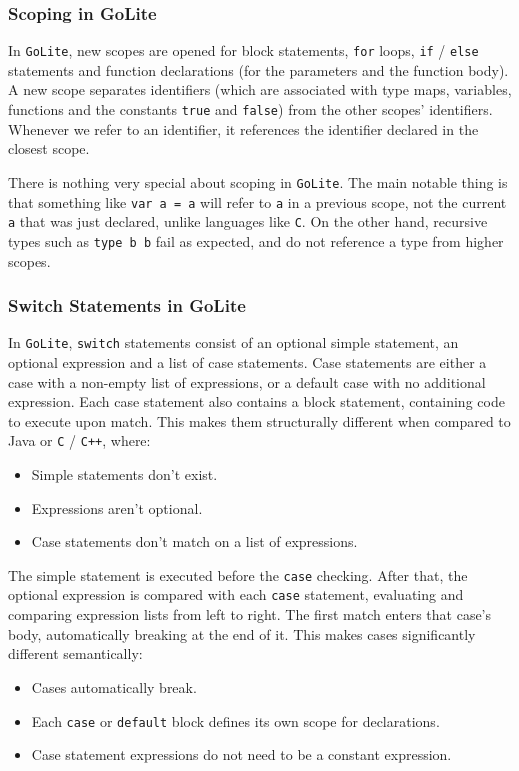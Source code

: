 \documentclass[11pt]{article}
\begin{document}
\subsubsection{Scoping in GoLite}
In \texttt{GoLite}, new scopes are opened for block statements,
\texttt{for} loops, \texttt{if} / \texttt{else} statements and
function declarations (for the parameters and the function body). A
new scope separates identifiers (which are associated with type maps,
variables, functions and the constants \texttt{true} and
\texttt{false}) from the other scopes' identifiers. Whenever we refer
to an identifier, it references the identifier declared in the closest
scope.

There is nothing very special about scoping in \texttt{GoLite}. The
main notable thing is that something like \texttt{var a = a} will
refer to \texttt{a} in a previous scope, not the current \texttt{a}
that was just declared, unlike languages like \texttt{C}.  On the
other hand, recursive types such as \texttt{type b b} fail as
expected, and do not reference a type from higher scopes.
\subsubsection{Switch Statements in GoLite}
In \texttt{GoLite}, \texttt{switch} statements consist of an optional
simple statement, an optional expression and a list of case
statements. Case statements are either a case with a non-empty list of
expressions, or a default case with no additional expression.  Each
case statement also contains a block statement, containing code to
execute upon match. This makes them structurally different when
compared to Java or \texttt{C} / \texttt{C++}, where:
\begin{itemize}
\item Simple statements don't exist.
\item Expressions aren't optional.
\item Case statements don't match on a list of expressions.
\end{itemize}
The simple statement is executed before the \texttt{case} checking.
After that, the optional expression is compared with each
\texttt{case} statement, evaluating and comparing expression lists
from left to right. The first match enters that case's body,
automatically breaking at the end of it. This makes cases
significantly different semantically:
\begin{itemize}
\item Cases automatically break.
\item Each \texttt{case} or \texttt{default} block defines its own
  scope for declarations.
\item Case statement expressions do not need to be a constant
  expression.
\end{itemize}
\end{document}
